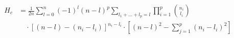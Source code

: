 \documentclass[12pt, a4paper]{article}
\begin{document}
\begin{equation}
    \begin{split}
        H_{c} & = \frac{1}{2n} \sum_{l=0}^{n} (-1)^{l} (n - l)^{p}
        \sum_{l_{1} + \dots + l_{p}=l} \prod_{i=1}^{p} \binom{n_i}{l_i} \\
              & \quad \cdot [(n-l) - (n_{i} - l_{i})]^{n_{i} - l_{i}}
        \cdot \left[(n - l)^{2} - \sum_{j=1}^{p} (n_{i} - l_{i})^2 \right]
    \end{split}
\end{equation}
\end{document}
